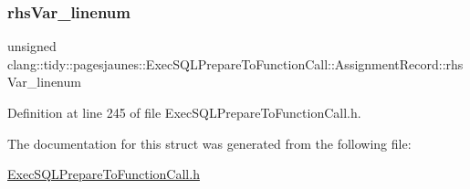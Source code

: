 \subsubsection{\texorpdfstring{rhs\+Var\+\_\+linenum}{rhsVar\_linenum}}
{\footnotesize\ttfamily unsigned clang\+::tidy\+::pagesjaunes\+::\+Exec\+S\+Q\+L\+Prepare\+To\+Function\+Call\+::\+Assignment\+Record\+::rhs\+Var\+\_\+linenum}



Definition at line 245 of file Exec\+S\+Q\+L\+Prepare\+To\+Function\+Call.\+h.



The documentation for this struct was generated from the following file\+:\begin{DoxyCompactItemize}
\item 
\hyperlink{_exec_s_q_l_prepare_to_function_call_8h}{Exec\+S\+Q\+L\+Prepare\+To\+Function\+Call.\+h}\end{DoxyCompactItemize}
